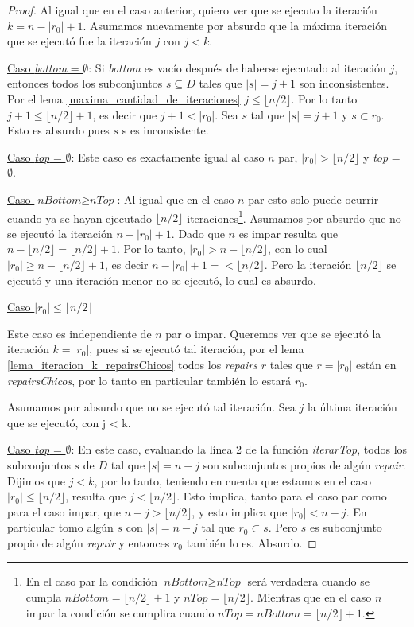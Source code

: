\documentclass[11pt,a4paper,twoside]{tesis}
\newcommand{\parteEntera}{\lfloor n/2 \rfloor}
\begin{document}
\begin{proof}
Al igual que en el caso anterior, quiero ver que se ejecuto la iteración $k = n - |r_0| + 1$. Asumamos nuevamente por absurdo que la máxima iteración que se ejecutó fue la iteración $j$ con $j < k$.

\underline{Caso \textit{bottom} = $\emptyset$}: Si \textit{bottom} es vacío después de haberse ejecutado al iteración $j$, entonces todos los subconjuntos $s \subseteq D$ tales que $|s| = j + 1$ son inconsistentes. Por el lema \ref{maxima_cantidad_de_iteraciones} $j\leq \parteEntera$. Por lo tanto $j+1 \leq \parteEntera + 1$, es decir que $j + 1 < |r_0|$. Sea $s$ tal que $|s| = j + 1$ y $s \subset r_0$. Esto es absurdo pues $s$ s es inconsistente.

\underline{Caso \textit{top} = $\emptyset$}: Este caso es exactamente igual al caso $n$ par, $|r_0| > \parteEntera$ y \textit{top} = $\emptyset$.

\underline{Caso $\textit{nBottom} \geq \textit{nTop}$}: Al igual que en el caso $n$ par esto solo puede ocurrir cuando ya se hayan ejecutado $\parteEntera$ iteraciones\footnote{En el caso par la condición $\textit{nBottom} \geq \textit{nTop}$ será verdadera cuando se cumpla $\textit{nBottom} = \parteEntera + 1$ y $\textit{nTop} = \parteEntera$. Mientras que en el caso $n$ impar la condición se cumplira cuando $\textit{nTop} = \textit{nBottom} = \parteEntera + 1$.}. Asumamos por absurdo que no se ejecutó la iteración $n - |r_0| + 1$. Dado que $n$ es impar resulta que $n - \parteEntera = \parteEntera + 1$. Por lo tanto, $|r_0| > n - \parteEntera$, con lo cual $|r_0| \geq n - \parteEntera + 1$, es decir  $n - |r_0| + 1 =< \parteEntera$. Pero la iteración $\parteEntera$ se ejecutó y una iteración menor no se ejecutó, lo cual es absurdo.

\begin{center}
\underline{Caso $|r_0| \leq \parteEntera$}
 \end{center}

Este caso es independiente de $n$ par o impar. Queremos ver que se ejecutó la iteración $k = |r_0|$, pues si se ejecutó tal iteración, por el lema \ref{lema_iteracion_k_repairsChicos} todos los \textit{repairs} $r$ tales que $r = |r_0|$ están en \textit{repairsChicos}, por lo tanto en particular también lo estará $r_0$.

Asumamos por absurdo que no se ejecutó tal iteración. Sea $j$ la última iteración que se ejecutó, con j < k.

\underline{Caso \textit{top} = $\emptyset$}: En este caso, evaluando la línea 2 de la función \textit{iterarTop}, todos los subconjuntos $s$ de $D$ tal que $|s| = n - j$ son subconjuntos propios de algún \textit{repair}. Dijimos que $j < k$, por lo tanto, teniendo en cuenta que estamos en el caso $|r_0| \leq \parteEntera$, resulta que $j < \parteEntera$. Esto implica, tanto para el caso par como para el caso impar, que $n - j > \parteEntera$, y esto implica que $|r_0| < n - j$. En particular tomo algún $s$ con $|s| = n - j$ tal que $r_0 \subset s$. Pero $s$ es subconjunto propio de algún \textit{repair} y entonces $r_0$ también lo es. Absurdo.


\end{proof}
\end{document}
